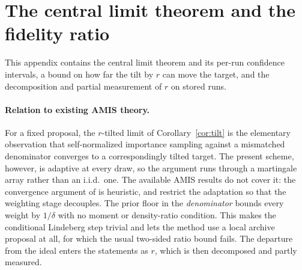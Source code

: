 \documentclass[10pt]{article}
\theoremstyle{plain}
\theoremstyle{definition}
\begin{document}



\appendix

\section{The central limit theorem and the fidelity ratio}\label{app:theory-more}
This appendix contains the central limit theorem and its per-run confidence intervals, a bound on how far the tilt by $r$ can move the target, and the decomposition and partial measurement of $r$ on stored runs.

\paragraph{Relation to existing AMIS theory.} For a fixed proposal, the $r$-tilted limit of Corollary~\ref{cor:tilt} is the elementary observation that self-normalized importance sampling against a mismatched denominator converges to a correspondingly tilted target. The present scheme, however, is adaptive at every draw, so the argument runs through a martingale array rather than an i.i.d.\ one. The available AMIS results do not cover it: the convergence argument of \citet{cornuet2012amis} is heuristic, and \citet{marin2019consistency} restrict the adaptation so that the weighting stage decouples. The prior floor in the \emph{denominator} bounds every weight by $1/\delta$ with no moment or density-ratio condition. This makes the conditional Lindeberg step trivial and lets the method use a local archive proposal at all, for which the usual two-sided ratio bound fails. The departure from the ideal enters the statements as $r$, which is then decomposed and partly measured.
\end{document}
